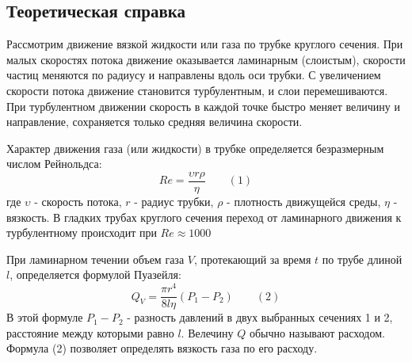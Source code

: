 \documentclass[12pt]{article}
\begin{document}
\subsection*{Теоретическая справка}
Рассмотрим движение вязкой жидкости или газа по трубке круглого сечения. При малых скоростях потока движение оказывается ламинарным (слоистым), скорости частиц меняются по радиусу и направлены вдоль оси трубки. С увеличением скорости потока движение становится турбулентным, и слои перемешиваются. При турбулентном движении скорость в каждой точке быстро меняет величину и направление, сохраняется только средняя величина скорости.

Характер движения газа (или жидкости) в трубке определяется безразмерным числом Рейнольдса:
\[Re = \dfrac{\upsilon r \rho}{\eta} \text{  } \text{  } \text{  }(1)\]
где $\upsilon$ - скорость потока, $r$ - радиус трубки, $\rho$ - плотность движущейся среды, $\eta$ - вязкость. В гладких трубах круглого сечения переход от ламинарного движения к турбулентному происходит при $Re \approx 1000$

При ламинарном течении объем газа $V$, протекающий за время $t$ по трубе длиной $l$, определяется формулой Пуазейля:
\[Q_V = \dfrac{\pi r^4}{8 l \eta}(P_1 - P_2) \text{  } \text{  } \text{  }(2)\]
В этой формуле $P_1 - P_2$ - разность давлений в двух выбранных сечениях 1 и 2, расстояние между которыми равно $l$. Велечину $Q$ обычно называют расходом. Формула (2) позволяет определять вязкость газа по его расходу.
\end{document}
